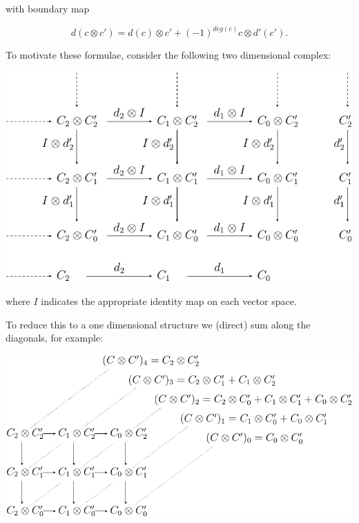 with boundary map

    $$ d(c\otimes c') = d(c)\otimes c' + (-1)^{deg(c)}c\otimes d'(c').$$




To motivate these formulae, consider the following
two dimensional complex:

\begin{center}
\includegraphics{figure_03.pdf}
\end{center}

where $I$ indicates the appropriate identity map on each vector space.

To reduce this to a one dimensional structure we
(direct) sum along the diagonals, for example:

\begin{center}
\includegraphics{figure_04.pdf}
\end{center}

